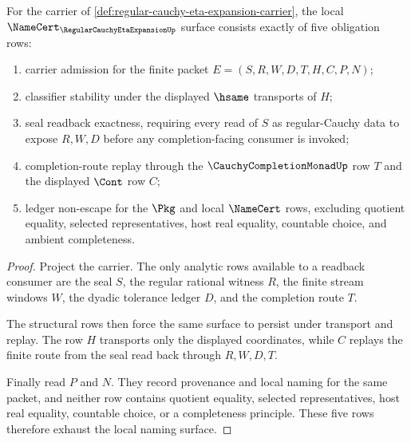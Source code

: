 \begin{theorem}
\label{thm:regular-cauchy-eta-expansion-namecert-obligations}
For the carrier of \autoref{def:regular-cauchy-eta-expansion-carrier}, the local $\NameCert_{\RegularCauchyEtaExpansionUp}$ surface consists exactly of five obligation rows:
\begin{enumerate}
\item carrier admission for the finite packet $E=(S,R,W,D,T,H,C,P,N)$;
\item classifier stability under the displayed $\hsame$ transports of $H$;
\item seal readback exactness, requiring every read of $S$ as regular-Cauchy data to expose $R,W,D$ before any completion-facing consumer is invoked;
\item completion-route replay through the $\CauchyCompletionMonadUp$ row $T$ and the displayed $\Cont$ row $C$;
\item ledger non-escape for the $\Pkg$ and local $\NameCert$ rows, excluding quotient equality, selected representatives, host real equality, countable choice, and ambient completeness.
\end{enumerate}
\end{theorem}
\begin{proof}
Project the carrier. The only analytic rows available to a readback consumer are the seal $S$, the regular rational witness $R$, the finite stream windows $W$, the dyadic tolerance ledger $D$, and the completion route $T$.

The structural rows then force the same surface to persist under transport and replay. The row $H$ transports only the displayed coordinates, while $C$ replays the finite route from the seal read back through $R,W,D,T$.

Finally read $P$ and $N$. They record provenance and local naming for the same packet, and neither row contains quotient equality, selected representatives, host real equality, countable choice, or a completeness principle. These five rows therefore exhaust the local naming surface.
\end{proof}

